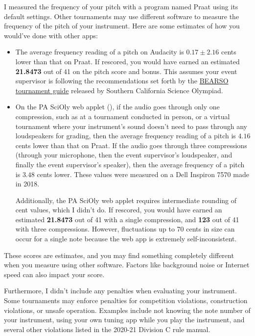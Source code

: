 \documentclass[12pt,letterpaper]{article}
\def\audacityEstimate{21.8473}
\def\pasciolyEstimate{21.8473}
\def\pasciolyEstimateTC{123}
\begin{document}
I measured the frequency of your pitch with a program named Praat using its default settings. Other tournaments may use different software to measure the frequency of the pitch of your instrument. Here are some estimates of how you would've done with other apps:
\begin{itemize}
\item The average frequency reading of a pitch on Audacity is $0.17\pm2.16
$ cents lower than that on Praat. If rescored, you would have earned an estimated \textbf{\audacityEstimate} out of 41 on the pitch score and bonus. This assumes your event supervisor is following the recommendations set forth by the \href{https://docs.google.com/document/d/1VBmM2NzHvc5F2ZHKz4Warf_NGrkn1ADL1Gx0DPHVrJ4/edit#bookmark=id.lu1jk8vh7g7z}{BEARSO tournament guide} released by Southern California Science Olympiad.


\item On the PA SciOly web applet (), if the audio goes through only one compression, such as at a tournament conducted in person, or a virtual tournament where your instrument's sound doesn't need to pass through any loudspeakers for grading, then the average frequency reading of a pitch is $4.16$ cents lower than that on Praat.  If the audio goes through three compressions (through your microphone, then the event supervisor's loudspeaker, and finally the event supervisor's speaker), then the average frequency of a pitch is $3.48$ cents lower. These values were measured on a Dell Inspiron 7570 made in 2018. %

Additionally, the PA SciOly web applet requires intermediate rounding of cent values, which I didn't do. If rescored, you would have earned an estimated \textbf{\pasciolyEstimate} out of 41 with a single compression, and \textbf{\pasciolyEstimateTC} out of 41 with three compressions. However, fluctuations up to 70 cents in size can occur for a single note because the web app is extremely self-inconsistent.
\end{itemize}
These scores are estimates, and you may find something completely different when you measure using other software. Factors like background noise or Internet speed can also impact your score.

Furthermore, I didn't include any penalties when evaluating your instrument. Some tournaments may enforce penalties for competition violations, construction violations, or unsafe operation. Examples include not knowing the note number of your instrument, using your own tuning app while you play the instrument, and several other violations listed in the 2020-21 Division C rule manual.
\end{document}
